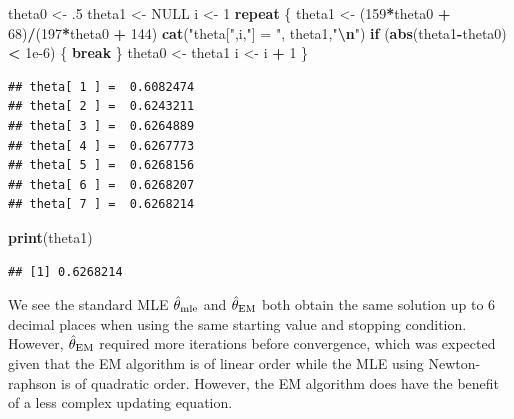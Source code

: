 \documentclass[
]{article}
\newenvironment{Shaded}{\begin{snugshade}}{\end{snugshade}}
\newcommand{\ConstantTok}[1]{\textcolor[rgb]{0.56,0.35,0.01}{#1}}
\newcommand{\ControlFlowTok}[1]{\textcolor[rgb]{0.13,0.29,0.53}{\textbf{#1}}}
\newcommand{\DecValTok}[1]{\textcolor[rgb]{0.00,0.00,0.81}{#1}}
\newcommand{\FloatTok}[1]{\textcolor[rgb]{0.00,0.00,0.81}{#1}}
\newcommand{\FunctionTok}[1]{\textcolor[rgb]{0.13,0.29,0.53}{\textbf{#1}}}
\newcommand{\NormalTok}[1]{#1}
\newcommand{\OtherTok}[1]{\textcolor[rgb]{0.56,0.35,0.01}{#1}}
\newcommand{\SpecialCharTok}[1]{\textcolor[rgb]{0.81,0.36,0.00}{\textbf{#1}}}
\newcommand{\StringTok}[1]{\textcolor[rgb]{0.31,0.60,0.02}{#1}}
\begin{document}
\begin{Shaded}
\begin{Highlighting}[]
\NormalTok{theta0 }\OtherTok{\textless{}{-}}\NormalTok{ .}\DecValTok{5}
\NormalTok{theta1 }\OtherTok{\textless{}{-}} \ConstantTok{NULL}
\NormalTok{i }\OtherTok{\textless{}{-}} \DecValTok{1}
\ControlFlowTok{repeat}
\NormalTok{\{}
\NormalTok{  theta1 }\OtherTok{\textless{}{-}}\NormalTok{ (}\DecValTok{159}\SpecialCharTok{*}\NormalTok{theta0 }\SpecialCharTok{+} \DecValTok{68}\NormalTok{)}\SpecialCharTok{/}\NormalTok{(}\DecValTok{197}\SpecialCharTok{*}\NormalTok{theta0 }\SpecialCharTok{+} \DecValTok{144}\NormalTok{)}
  \FunctionTok{cat}\NormalTok{(}\StringTok{"theta["}\NormalTok{,i,}\StringTok{"] = "}\NormalTok{, theta1,}\StringTok{"}\SpecialCharTok{\textbackslash{}n}\StringTok{"}\NormalTok{)}
  \ControlFlowTok{if}\NormalTok{ (}\FunctionTok{abs}\NormalTok{(theta1}\SpecialCharTok{{-}}\NormalTok{theta0) }\SpecialCharTok{\textless{}} \FloatTok{1e{-}6}\NormalTok{) \{ }\ControlFlowTok{break}\NormalTok{ \}}
\NormalTok{  theta0 }\OtherTok{\textless{}{-}}\NormalTok{ theta1}
\NormalTok{  i }\OtherTok{\textless{}{-}}\NormalTok{ i }\SpecialCharTok{+} \DecValTok{1}
\NormalTok{\}}
\end{Highlighting}
\end{Shaded}

\begin{verbatim}
## theta[ 1 ] =  0.6082474 
## theta[ 2 ] =  0.6243211 
## theta[ 3 ] =  0.6264889 
## theta[ 4 ] =  0.6267773 
## theta[ 5 ] =  0.6268156 
## theta[ 6 ] =  0.6268207 
## theta[ 7 ] =  0.6268214
\end{verbatim}

\begin{Shaded}
\begin{Highlighting}[]
\FunctionTok{print}\NormalTok{(theta1)}
\end{Highlighting}
\end{Shaded}

\begin{verbatim}
## [1] 0.6268214
\end{verbatim}

We see the standard MLE \(\hat\theta_{\rm{mle}}\) and
\(\hat\theta_{\rm{EM}}\) both obtain the same solution up to \(6\)
decimal places when using the same starting value and stopping
condition. However, \(\hat\theta_{\rm{EM}}\) required more iterations
before convergence, which was expected given that the EM algorithm is of
linear order while the MLE using Newton-raphson is of quadratic order.
However, the EM algorithm does have the benefit of a less complex
updating equation.
\end{document}
